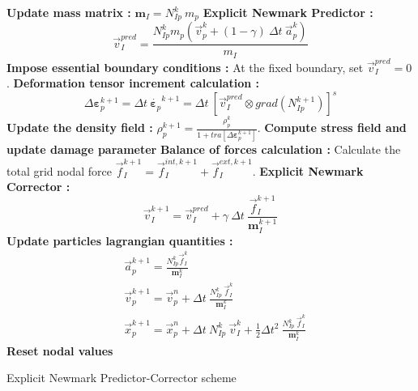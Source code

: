 \documentclass[preprint,12pt,a4paper]{elsarticle}
\newcommand{\tens}[1]{
  \ensuremath{\mathbf{{#1}}}
}
\newcommand\Grad[1]{grad({#1})}
\begin{document}
\begin{algorithm}[H]
  \DontPrintSemicolon
    \textbf{Update mass matrix :} $ \tens{m}_{I} = N_{Ip}^{k}\ m_p$ \;
    \textbf{Explicit Newmark Predictor :}
    \begin{equation*}
      \vec{v}_I^{pred} = \frac{ N_{Ip}^{k} m_p (\vec{v}_p^k + (1 - \gamma)\ \Delta t\ \vec{a}_p^k)}{m_I}
    \end{equation*}\;
    \textbf{Impose essential boundary conditions :} At the fixed
    boundary, set $\vec{v}_{I}^{pred} = 0$.\; 
    \textbf{Deformation tensor increment calculation :}
    \begin{equation*}
      \Delta \tens{\varepsilon}_{p}^{k+1} = \Delta t\
        \dot{\tens{\varepsilon}_{p}}^{k+1} = \Delta t\ \left[ \vec{v}_{I}^{pred} \otimes
        \Grad{N_{Ip}^{k+1}} \right]^s
    \end{equation*} \;
    \textbf{Update the density field :} $\rho_p^{k+1} =
    \frac{\rho_p^k}{1 + \mathit{tra}\left[\Delta\tens{\varepsilon}_{p}^{k+1}\right]}.$\;
    \textbf{Compute stress field and update damage parameter}\;
    \textbf{Balance of forces calculation :} Calculate the total grid
    nodal force $\vec{f}_{I}^{k+1} = \vec{f}_{I}^{int,k+1} + \vec{f}_{I}^{ext,k+1}$.\;
    \textbf{Explicit Newmark Corrector :}
    \begin{equation*}
      \vec{v}_{I}^{k+1} = \vec{v}_{I}^{pred} + \gamma\ \Delta t\ \frac{\vec{f}_{I}^{k+1}}{\tens{m}_I^{k+1}}  
    \end{equation*}\;
    \textbf{Update particles lagrangian quantities :}
    \begin{align*}
      &\vec{a}_p^{k+1} = \frac{N_{Ip}^k\vec{f}_{I}^{k}}{\tens{m}_I^k}\\
      &\vec{v}_p^{k+1} = \vec{v}_p^n + \Delta t\
        \frac{N_{Ip}^k\
        \vec{f}_{I}^{k}}{\tens{m}_I^k}\\
      &\vec{x}_p^{k+1} = \vec{x}_p^n + \Delta t\
         N_{Ip}^k\ \vec{v}_{I}^{k} +
        \frac{1}{2}\Delta t^2\ \frac{N_{Ip}^k\
        \vec{f}_{I}^{k}}{\tens{m}_I^k}
    \end{align*}\;
    \textbf{Reset nodal values}\;
    \label{alg-epc}
    \caption{Explicit Newmark Predictor-Corrector scheme}
\end{algorithm} 
\end{document}

